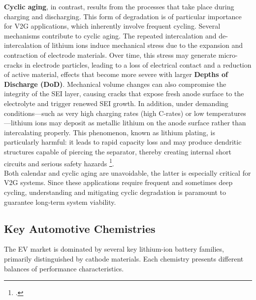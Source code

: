 \textbf{Cyclic aging}, in contrast, results from the processes that take place during charging and discharging. This form of degradation is of particular importance for V2G applications, which inherently involve frequent cycling. Several mechanisms contribute to cyclic aging. The repeated intercalation and de-intercalation of lithium ions induce mechanical stress due to the expansion and contraction of electrode materials. Over time, this stress may generate micro-cracks in electrode particles, leading to a loss of electrical contact and a reduction of active material, effects that become more severe with larger \textbf{Depths of Discharge (DoD)}. Mechanical volume changes can also compromise the integrity of the SEI layer, causing cracks that expose fresh anode surface to the electrolyte and trigger renewed SEI growth. In addition, under demanding conditions—such as very high charging rates (high C-rates) or low temperatures—lithium ions may deposit as metallic lithium on the anode surface rather than intercalating properly. This phenomenon, known as lithium plating, is particularly harmful: it leads to rapid capacity loss and may produce dendritic structures capable of piercing the separator, thereby creating internal short circuits and serious safety hazards \footcite{birkl2017degradation}.
\noindent   
\\
Both calendar and cyclic aging are unavoidable, the latter is especially critical for V2G systems. Since these applications require frequent and sometimes deep cycling, understanding and mitigating cyclic degradation is paramount to guarantee long-term system viability.


\subsection{Key Automotive Chemistries}

The EV market is dominated by several key lithium-ion battery families, primarily distinguished by cathode materials. Each chemistry presents different balances of performance characteristics.

